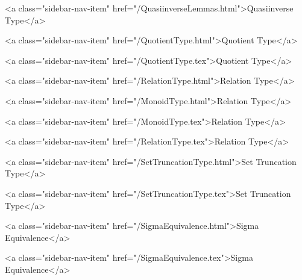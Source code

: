       
    
      
        
          <a class="sidebar-nav-item" href="/QuasiinverseLemmas.html">Quasiinverse Type</a>
        
      
    
      
        
          <a class="sidebar-nav-item" href="/QuotientType.html">Quotient Type</a>
        
      
    
      
        
          <a class="sidebar-nav-item" href="/QuotientType.tex">Quotient Type</a>
        
      
    
      
        
          <a class="sidebar-nav-item" href="/RelationType.html">Relation Type</a>
        
      
    
      
        
          <a class="sidebar-nav-item" href="/MonoidType.html">Relation Type</a>
        
      
    
      
        
          <a class="sidebar-nav-item" href="/MonoidType.tex">Relation Type</a>
        
      
    
      
        
          <a class="sidebar-nav-item" href="/RelationType.tex">Relation Type</a>
        
      
    
      
        
          <a class="sidebar-nav-item" href="/SetTruncationType.html">Set Truncation Type</a>
        
      
    
      
        
          <a class="sidebar-nav-item" href="/SetTruncationType.tex">Set Truncation Type</a>
        
      
    
      
        
          <a class="sidebar-nav-item" href="/SigmaEquivalence.html">Sigma Equivalence</a>
        
      
    
      
        
          <a class="sidebar-nav-item" href="/SigmaEquivalence.tex">Sigma Equivalence</a>
        
